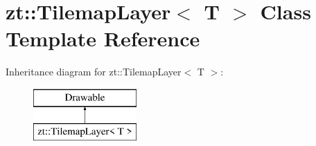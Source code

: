 \hypertarget{classzt_1_1_tilemap_layer}{}\section{zt\+:\+:Tilemap\+Layer$<$ T $>$ Class Template Reference}
\label{classzt_1_1_tilemap_layer}
Inheritance diagram for zt\+:\+:Tilemap\+Layer$<$ T $>$\+:\begin{figure}[H]
\begin{center}
\leavevmode
\includegraphics[height=2.000000cm]{classzt_1_1_tilemap_layer}
\end{center}
\end{figure}
